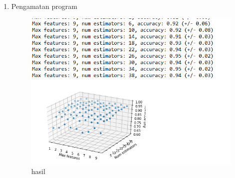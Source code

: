 \begin{enumerate}
\item Pengamatan program 

\begin{figure}[ht]
\centering
\includegraphics[scale=0.5]{figures/1174050/chapter4/13.PNG}
\caption{hasil}
\label{Praktek no 8}
\end{figure}
\end{enumerate}


